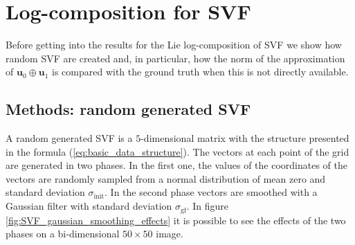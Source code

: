 \section{Log-composition for SVF}
Before getting into the results for the Lie log-composition of SVF we show how random SVF are created and, in particular, how the norm of the approximation of $\mathbf{u}_0\oplus \mathbf{u}_1$ is compared with the ground truth when this is not directly available.

\subsection{Methods: random generated SVF}
A random generated SVF is a $5$-dimensional matrix with the structure presented in the formula (\ref{eq:basic_data_structure}). 
The vectors at each point of the grid are generated in two phases. 
In the first one, the values of the coordinates of the vectors are randomly sampled from a normal distribution of mean zero and standard deviation $\sigma_{\text{init}}$. 
In the second phase vectors are smoothed with a Gaussian filter with standard deviation $\sigma_{\text{gf}}$. In figure \ref{fig:SVF_gaussian_smoothing_effects} it is possible to see the effects of the two phases on a bi-dimensional $50\times 50$ image.

